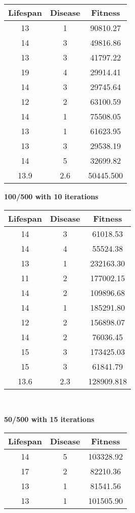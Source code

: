 \documentclass[conference,compsoc]{IEEEtran}
\begin{document}
\begin{table}[!t]
\begin{center}
\begin{minipage}{0.25\textwidth}
\begin{tabular}{|c|c|c|}
	\hline
	Lifespan & Disease & Fitness\\
	\hline
	13 & 1 & 90810.27\\
	14 & 3 & 49816.86\\
	13 & 3 & 41797.22\\
	19 & 4 & 29914.41\\
	14 & 3 & 29745.64\\
	12 & 2 & 63100.59\\
	14 & 1 & 75508.05\\
	13 & 1 & 61623.95\\
	13 & 3 & 29538.19\\
	14 & 5 & 32699.82\\
	\hline
	13.9 & 2.6 & 50445.500\\
	\hline
	\end{tabular}
\end{minipage}%
\begin{minipage}{0.25\textwidth}
\centering
\textbf{100/500 with 10 iterations}\\
	\begin{tabular}{|c|c|c|}
	\hline
	Lifespan & Disease & Fitness\\
	\hline
	14 & 3 &  61018.53\\
	14 & 4 &  55524.38\\
	13 & 1 & 232163.30\\
	11 & 2 & 177002.15\\
	14 & 2 & 109896.68\\
	14 & 1 & 185291.80\\
	12 & 2 & 156898.07\\
	14 & 2 &  76036.45\\
	15 & 3 & 173425.03\\
	15 & 3 &  61841.79\\
	\hline
	13.6 & 2.3 & 128909.818\\
	\hline
	\end{tabular}
\end{minipage}%
\\[3ex]
\begin{minipage}{0.25\textwidth}
\centering
\textbf{50/500 with 15 iterations}\\
	\begin{tabular}{|c|c|c|}
	\hline
	Lifespan & Disease & Fitness\\
	\hline
	14 & 5 & 103328.92\\
	17 & 2 &  82210.36\\
	13 & 1 &  81541.56\\
	13 & 1 & 101505.90\\

\end{tabular}
\end{minipage}
\end{center}
\end{table}
\end{document}
